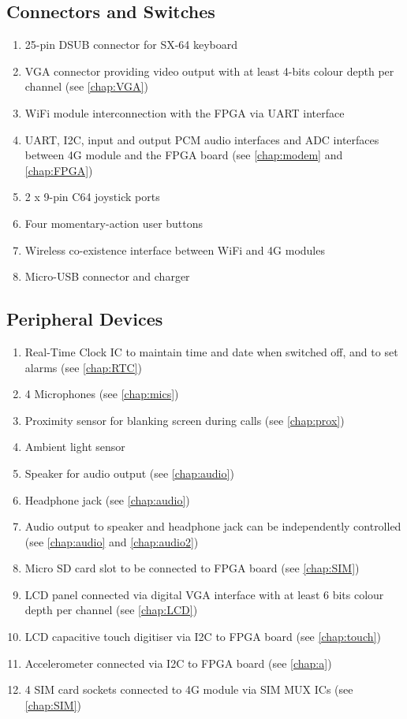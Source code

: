 \subsection{Connectors and Switches}
\begin{enumerate}
\item 25-pin DSUB connector for SX-64 keyboard 
\item VGA connector providing video output with at least 4-bits colour depth per channel (see \autoref{chap:VGA})
\item WiFi module interconnection with the FPGA via UART interface
\item UART, I2C, input and output PCM audio interfaces and ADC interfaces between 4G module and the FPGA board (see \autoref{chap:modem} and \autoref{chap:FPGA})
\item 2 x 9-pin C64 joystick ports
\item Four momentary-action user buttons 
\item Wireless co-existence interface between WiFi and 4G modules 
\item Micro-USB connector and charger
\end{enumerate}

\subsection{Peripheral Devices}
\begin{enumerate}
\item Real-Time Clock IC to maintain time and date when switched off, and to set alarms (see \autoref{chap:RTC})
\item 4 Microphones (see \autoref{chap:mics})
\item Proximity sensor for blanking screen during calls (see \autoref{chap:prox})
\item Ambient light sensor 
\item Speaker for audio output (see \autoref{chap:audio})
\item Headphone jack (see \autoref{chap:audio})
\item Audio output to speaker and headphone jack can be independently controlled (see \autoref{chap:audio} and \autoref{chap:audio2})
\item Micro SD card slot to be connected to FPGA board (see \autoref{chap:SIM})
\item LCD panel connected via digital VGA interface with at least 6 bits colour depth per channel (see \autoref{chap:LCD})
\item LCD capacitive touch digitiser via I2C to FPGA board (see \autoref{chap:touch})
\item Accelerometer connected via I2C to FPGA board (see \autoref{chap:a})
\item 4 SIM card sockets connected to 4G module via SIM MUX ICs (see \autoref{chap:SIM})
\end{enumerate}




